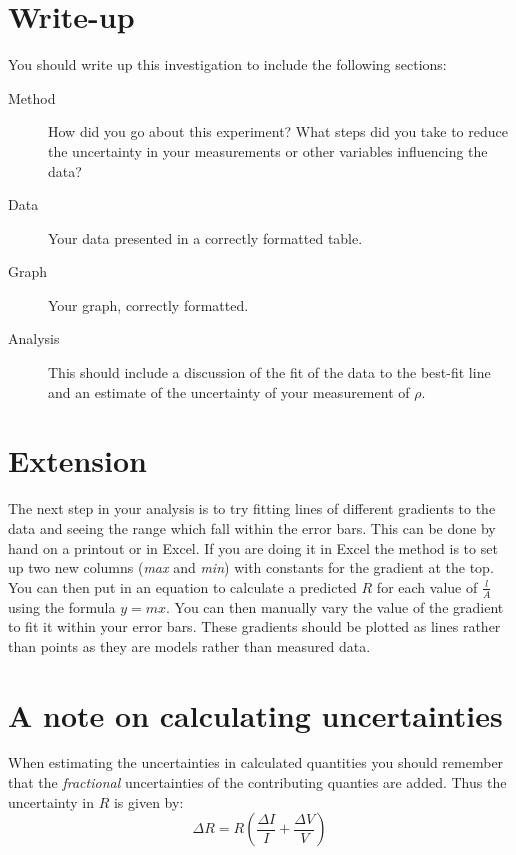 \documentclass[11pt]{article}
\begin{document}
\begin{adjustwidth}{0cm}{0.4\textwidth}
\section{Write-up}
You should write up this investigation to include the following sections:
\begin{description}
    \item[Method] How did you go about this experiment?  What steps did you take to reduce the uncertainty in your measurements or other variables influencing the data?
    \item[Data] Your data presented in a correctly formatted table.
    \item[Graph] Your graph, correctly formatted.
    \item[Analysis] This should include a discussion of the fit of the data to the best-fit line and an estimate of the uncertainty of your measurement of $\rho$.
\end{description}

\section*{Extension}
The next step in your analysis is to try fitting lines of different gradients to the data and seeing the range which fall within the error bars.  This can be done by hand on a printout or in Excel.  If you are doing it in Excel the method is to set up two new columns (\emph{max} and \emph{min}) with constants for the gradient at the top.  You can then put in an equation to calculate a predicted $R$ for each value of $\frac{l}{A}$ using the formula $y=mx$.  You can then manually vary the value of the gradient to fit it within your error bars.  These gradients should be plotted as lines rather than points as they are models rather than measured data.


\end{adjustwidth}
\section*{A note on calculating uncertainties}
When estimating the uncertainties in calculated quantities you should remember that the \emph{fractional} uncertainties of the contributing quanties are added.  Thus the uncertainty in $R$ is given by: 
$$ \Delta R = R \left(\frac{\Delta I}{I}+\frac{\Delta V}{V} \right)$$
\end{document}
